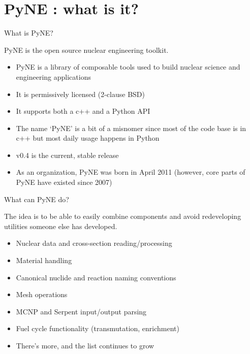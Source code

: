 \documentclass[xcolor=x11names,compress]{beamer}
\renewcommand{\(}{\begin{columns}}
\renewcommand{\)}{\end{columns}}
\newcommand{\<}[1]{\begin{column}{#1}}
\renewcommand{\>}{\end{column}}
\begin{document}
\section{PyNE \cite{pyne}: what is it?}
\begin{frame}{What is PyNE?}

    PyNE is \textcolor{dgreen}{the} open source nuclear engineering toolkit.
    \vspace*{1em}
    \begin{itemize}
      \item PyNE is a \alert{library of composable tools} used to build
      nuclear science and engineering applications
      \item It is \alert{permissively licensed} (2-clause BSD)
      \item It supports both a \alert{c++} and a \alert{Python} API
      \item The name `PyNE' is a bit of a misnomer since most of the code
      base is in c++ but most daily usage happens in Python
      \item \alert{v0.4} is the current, stable release
      \item As an organization, PyNE was born in April 2011
      (however, core parts of PyNE have existed since 2007)
    \end{itemize}

\end{frame}

\begin{frame}{What can PyNE do?}

    The idea is to be able to easily combine components and avoid redeveloping
    utilities someone else has developed.

    \begin{itemize}
      \item \alert{Nuclear data} and cross-section reading/processing
      \item Material handling
      \item Canonical nuclide and reaction naming conventions
      \item Mesh operations
      \item MCNP and Serpent input/output parsing
      \item Fuel cycle functionality (transmutation, enrichment)
      \item There's more, and the list continues to grow
    \end{itemize}

\end{frame}
\end{document}
